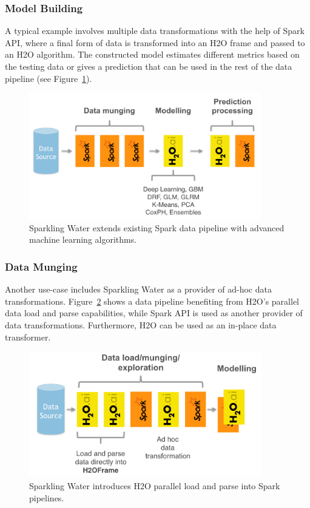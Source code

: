 \documentclass{standalone}
\begin{document}
    \subsubsection{Model Building}
    A typical example involves multiple data transformations with the help of Spark API, where a final form of data is
    transformed into an H2O frame and passed to an H2O algorithm. The constructed model estimates different metrics based
    on the testing data or gives a prediction that can be used in the rest of the data pipeline (see Figure~\ref{fig:uc1}).
    \begin{figure}[h!]
        \centering
        \includegraphics[width=0.9\textwidth]{../images/uc1.png}
        \caption{Sparkling Water extends existing Spark data pipeline with advanced machine learning algorithms.}
        \label{fig:uc1}
    \end{figure}

    \subsubsection{Data Munging}
    Another use-case includes Sparkling Water as a provider of ad-hoc data transformations. Figure~\ref{fig:uc2} shows
    a data pipeline benefiting from H2O's parallel data load and parse capabilities, while Spark API is used as another
    provider of data transformations. Furthermore, H2O can be used as an in-place data transformer.

    \begin{figure}[h!]
        \centering
        \includegraphics[width=0.9\textwidth]{../images/uc2.png}
        \caption{Sparkling Water introduces H2O parallel load and parse into Spark pipelines.}
        \label{fig:uc2}
    \end{figure}
\end{document}

